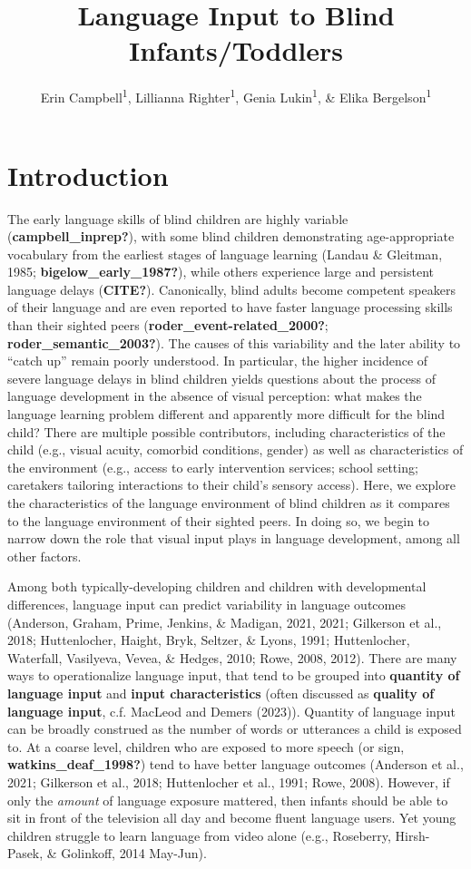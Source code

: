 \documentclass[
  man,floatsintext]{apa6}
\title{Language Input to Blind Infants/Toddlers}
\author{Erin Campbell\textsuperscript{1}, Lillianna Righter\textsuperscript{1}, Genia Lukin\textsuperscript{1}, \& Elika Bergelson\textsuperscript{1}}
\date{}
\affiliation{\vspace{0.5cm}\textsuperscript{1} Department of Psychology \& Neuroscience, Duke University, Durham, NC}
\begin{document}
\maketitle

\hypertarget{introduction}{%
\section{Introduction}\label{introduction}}

The early language skills of blind children are highly variable (\textbf{campbell\_inprep?}), with some blind children demonstrating age-appropriate vocabulary from the earliest stages of language learning (Landau \& Gleitman, 1985; \textbf{bigelow\_early\_1987?}), while others experience large and persistent language delays (\textbf{CITE?}). Canonically, blind adults become competent speakers of their language and are even reported to have faster language processing skills than their sighted peers (\textbf{roder\_event-related\_2000?}; \textbf{roder\_semantic\_2003?}). The causes of this variability and the later ability to ``catch up'' remain poorly understood. In particular, the higher incidence of severe language delays in blind children yields questions about the process of language development in the absence of visual perception: what makes the language learning problem different and apparently more difficult for the blind child? There are multiple possible contributors, including characteristics of the child (e.g., visual acuity, comorbid conditions, gender) as well as characteristics of the environment (e.g., access to early intervention services; school setting; caretakers tailoring interactions to their child's sensory access). Here, we explore the characteristics of the language environment of blind children as it compares to the language environment of their sighted peers. In doing so, we begin to narrow down the role that visual input plays in language development, among all other factors.

Among both typically-developing children and children with developmental differences, language input can predict variability in language outcomes (Anderson, Graham, Prime, Jenkins, \& Madigan, 2021, 2021; Gilkerson et al., 2018; Huttenlocher, Haight, Bryk, Seltzer, \& Lyons, 1991; Huttenlocher, Waterfall, Vasilyeva, Vevea, \& Hedges, 2010; Rowe, 2008, 2012). There are many ways to operationalize language input, that tend to be grouped into \textbf{quantity of language input} and \textbf{input characteristics} (often discussed as \textbf{quality of language input}, c.f. MacLeod and Demers (2023)). Quantity of language input can be broadly construed as the number of words or utterances a child is exposed to. At a coarse level, children who are exposed to more speech (or sign, \textbf{watkins\_deaf\_1998?}) tend to have better language outcomes (Anderson et al., 2021; Gilkerson et al., 2018; Huttenlocher et al., 1991; Rowe, 2008). However, if only the \emph{amount} of language exposure mattered, then infants should be able to sit in front of the television all day and become fluent language users. Yet young children struggle to learn language from video alone (e.g., Roseberry, Hirsh-Pasek, \& Golinkoff, 2014 May-Jun).
\end{document}
